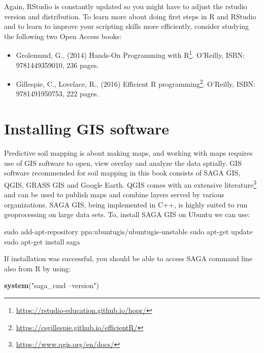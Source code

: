 \documentclass[graybox,natbib,nospthms,UStrade]{svmono}
\newenvironment{Shaded}{\begin{snugshade}}{\end{snugshade}}
\newcommand{\FunctionTok}[1]{\textcolor[rgb]{0,0,0}{#1}}
\newcommand{\KeywordTok}[1]{\textcolor[rgb]{0.27,0.27,0.27}{\textbf{#1}}}
\newcommand{\NormalTok}[1]{#1}
\newcommand{\StringTok}[1]{\textcolor[rgb]{0.5,0.5,0.5}{#1}}
\renewcommand{\href}[2]{#2 (\url{#1})}
\renewcommand{\href}[2]{#2\footnote{\url{#1}}}
\begin{document}
Again, RStudio is constantly updated so you might have to adjust the rstudio version and distribution.
To learn more about doing first steps in R and RStudio and to learn to improve your scripting skills more efficiently, consider studying the following two Open Access books:

\begin{itemize}
\item
  Grolemund, G., (2014) \href{https://rstudio-education.github.io/hopr/}{Hands-On Programming with R}. O'Reilly, ISBN: 9781449359010, 236 pages.
\item
  Gillespie, C., Lovelace, R., (2016) \href{https://csgillespie.github.io/efficientR/}{Efficient R programming}. O'Reilly, ISBN: 9781491950753, 222 pages.
\end{itemize}

\hypertarget{installing-gis-software}{%
\section{Installing GIS software}\label{installing-gis-software}}

Predictive soil mapping is about making maps, and working with maps requires use of GIS software to open, view overlay and analyze the data sptially. GIS software recommended for soil mapping in this book consists of SAGA GIS, QGIS, GRASS GIS and Google Earth. QGIS comes with an \href{https://www.qgis.org/en/docs/}{extensive literature} and can be used to publish maps and combine layers served by various organizations.
SAGA GIS, being implemented in C++, is highly suited to run geoprocessing on large data sets.
To, install SAGA GIS on Ubuntu we can use:

\begin{Shaded}
\begin{Highlighting}[]
\FunctionTok{sudo}\NormalTok{ add-apt-repository ppa:ubuntugis/ubuntugis-unstable}
\FunctionTok{sudo}\NormalTok{ apt-get update}
\FunctionTok{sudo}\NormalTok{ apt-get install saga}
\end{Highlighting}
\end{Shaded}

If installation was successful, you should be able to access SAGA command line also from R by using:

\begin{Shaded}
\begin{Highlighting}[]
\KeywordTok{system}\NormalTok{(}\StringTok{"saga_cmd --version"}\NormalTok{)}
\end{Highlighting}
\end{Shaded}
\end{document}
